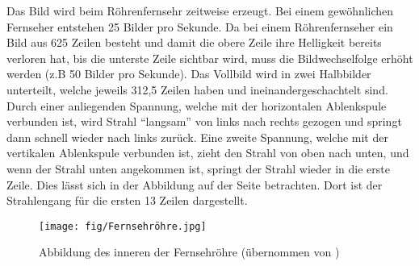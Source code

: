 Das Bild wird beim Röhrenfernsehr zeitweise erzeugt.
Bei einem gewöhnlichen Fernseher entstehen 25 Bilder pro Sekunde.
Da bei einem Röhrenfernseher ein Bild aus 625 Zeilen besteht und damit die obere Zeile ihre Helligkeit bereits verloren hat, bis die unterste Zeile sichtbar wird, muss die Bildwechselfolge erhöht werden (z.B 50 Bilder pro Sekunde).
Das Vollbild wird in zwei Halbbilder unterteilt, welche jeweils 312,5 Zeilen haben und ineinandergeschachtelt sind.
Durch einer anliegenden Spannung, welche mit der horizontalen Ablenkspule verbunden ist, wird Strahl "`langsam"' von links nach rechts gezogen und springt dann schnell wieder nach links zurück.
Eine zweite Spannung, welche mit der vertikalen Ablenkspule verbunden ist, zieht den Strahl von oben nach unten, und wenn der Strahl unten angekommen ist, springt der Strahl wieder in die erste Zeile.
Dies lässt sich in der Abbildung auf der Seite \cite{Roehrenfernsehr} betrachten.
Dort ist der Strahlengang für die ersten 13 Zeilen dargestellt.
\begin{figure}
    \centering
    \texttt{[image: fig/Fernsehröhre.jpg]}
    \caption{Abbildung des inneren der Fernsehröhre (übernommen von \cite{Abbildung}) }
    \label{fig:Fernsehroehre}
\end{figure}
